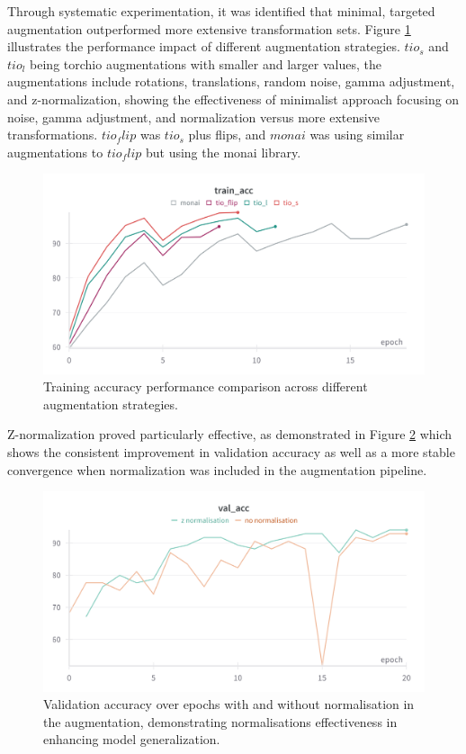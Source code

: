 \documentclass[11pt, a4paper]{article}
\begin{document}
Through systematic experimentation, it was identified that minimal, targeted augmentation outperformed more extensive transformation sets. Figure \ref{fig:augmentation_comparison} illustrates the performance impact of different augmentation strategies. $tio_s$ and $tio_l$ being torchio augmentations with smaller and larger values, the augmentations include rotations, translations, random noise, gamma adjustment, and z-normalization, showing the effectiveness of minimalist approach focusing on noise, gamma adjustment, and normalization versus more extensive transformations. $tio_flip$ was $tio_s$ plus flips, and $monai$ was using similar augmentations to $tio_flip$ but using the monai library.

\begin{figure}[htbp]
  \centering
  \includegraphics[width=\textwidth]{figures/augs_train_acc.png}
  \caption{Training accuracy performance comparison across different augmentation strategies.}
  \label{fig:augmentation_comparison}
\end{figure}

Z-normalization proved particularly effective, as demonstrated in Figure \ref{fig:normalisation_accuracy} which shows the consistent improvement in validation accuracy as well as a more stable convergence when normalization was included in the augmentation pipeline.

\begin{figure}[htbp]
  \centering
  \includegraphics[width=\textwidth]{figures/znorm_val_acc.png}
  \caption{Validation accuracy over epochs with and without normalisation in the augmentation, demonstrating normalisations effectiveness in enhancing model generalization.}
  \label{fig:normalisation_accuracy}
\end{figure}
\end{document}

